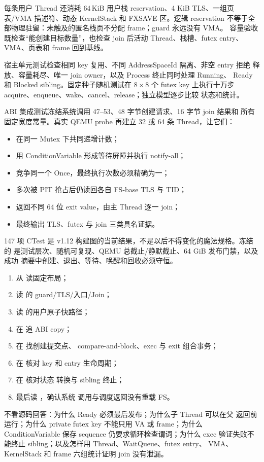 每条用户 Thread 还消耗 \(64\,\mathrm{KiB}\) 用户栈 reservation、4 KiB
TLS、一组页表/VMA 描述符、动态 KernelStack 和 FXSAVE 区。逻辑 reservation
不等于全部物理驻留：未触及的匿名栈页不分配 frame；guard 永远没有 VMA。
容量验收既检查“能创建目标数量”，也检查 join 后活动 Thread、栈槽、futex
entry、VMA、页表和 frame 回到基线。

宿主单元测试检查相同 key 复用、不同 AddressSpaceId 隔离、非空 entry 拒绝
释放、容量耗尽、唯一 join owner，以及 Process 终止同时处理 Running、
Ready 和 Blocked sibling。固定种子随机测试在 \(8\times8\) 个 futex key
上执行十万步 acquire、enqueue、wake、cancel、release；独立模型逐步比较
状态和统计。

ABI 集成测试冻结系统调用 47--53、48 字节创建请求、16 字节 join 结果和
所有固定宽度常量。真实 QEMU probe 再建立 32 或 64 条 Thread，让它们：

\begin{itemize}
  \item 在同一 Mutex 下共同递增计数；
  \item 用 ConditionVariable 形成等待屏障并执行 notify-all；
  \item 竞争同一个 Once，最终执行次数必须精确为一；
  \item 多次被 PIT 抢占后仍读回各自 FS-base TLS 与 TID；
  \item 返回不同 64 位 exit value，由主 Thread 逐一 join；
  \item 最终输出 TLS、futex 与 join 三类具名证据。
\end{itemize}

147 项 CTest 是 v1.12 构建图的当前结果，不是以后不得变化的魔法规格。冻结的
是测试层次、随机可复现、QEMU 总截止/静默截止、64 GiB 发布门禁，以及成功
摘要中创建、退出、等待、唤醒和回收必须守恒。

\par
\begin{enumerate}[label=\arabic*.]
  \item 从  读固定布局；
  \item 读  的 guard/TLS/入口/Join；
  \item 读  的用户原子快路径；
  \item 在  追 ABI copy；
  \item 在  找创建提交点、
        compare-and-block、exec 与 exit 组合事务；
  \item 在  核对 key 和 entry
        生命周期；
  \item 在  核对状态
        转换与 sibling 终止；
  \item 最后读 ，确认系统
        调用与调度返回没有重载 FS。
\end{enumerate}

\begin{contractbox}
不看源码回答：为什么 Ready 必须最后发布；为什么子 Thread 可以在父
 返回前运行；为什么 private futex key 不能只用 VA 或
frame；为什么 ConditionVariable 保存 sequence 仍要求循环检查谓词；为什么
exec 验证失败不能终止 sibling；以及怎样用 Thread、WaitQueue、futex entry、
VMA、KernelStack 和 frame 六组统计证明 join 没有泄漏。
\end{contractbox}
